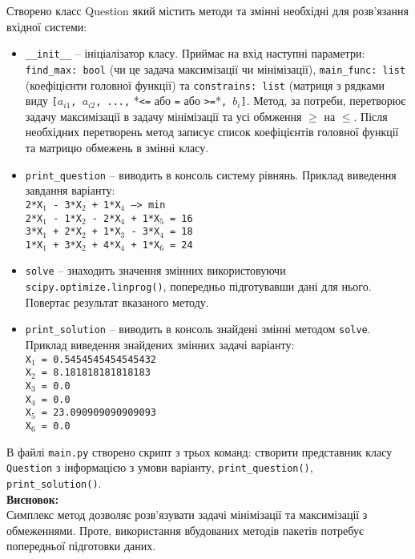 \documentclass{article}
\begin{document}
Створено класс Question який містить методи та змінні необхідні для розв'язання вхідної системи:
\begin{itemize}
	\item\texttt{\_\_init\_\_} -- ініціалізатор класу. Приймає на вхід наступні параметри: \texttt{find\_max: bool} (чи це задача максимізації чи мінімізації),  \texttt{main\_func: list} (коефіцієнти головної функції) та \texttt{constrains: list} (матриця з рядками виду \texttt{[$a_{i1}$, $a_{i2}$, ...,} *\texttt{<=} або \texttt{=} або \texttt{>=}*\texttt{, $b_i$]}. Метод, за потреби, перетворює задачу максимізації в задачу мінімізації та усі обмження $\geq$ на $\leq$. Після необхідних перетворень метод записує список коефіцієнтів головної функції та матрицю обмежень в змінні класу.
	\item\texttt{print\_question} -- виводить в консоль систему рівнянь. Приклад виведення завдання варіанту:\\
	\texttt{2*X$_1$ - 3*X$_2$ + 1*X$_4$ --> min\\
 2*X$_1$ - 1*X$_2$ - 2*X$_4$ + 1*X$_5$ = 16\\
 3*X$_1$ + 2*X$_2$ + 1*X$_3$ - 3*X$_4$ = 18\\
 1*X$_1$ + 3*X$_2$ + 4*X$_4$ + 1*X$_6$ = 24}
 	\item\texttt{solve} -- знаходить значення змінних використовуючи \texttt{scipy.optimize.linprog()}, попередньо підготувавши дані для нього. Повертає результат вказаного методу.
 	\item\texttt{print\_solution} -- виводить в консоль знайдені змінні методом \texttt{solve}. Приклад виведення знайдених змінних задачі варіанту:\\
 	\texttt{X$_1$ = 0.5454545454545432\\
X$_2$ = 8.181818181818183\\
X$_3$ = 0.0\\
X$_4$ = 0.0\\
X$_5$ = 23.090909090909093\\
X$_6$ = 0.0}
\end{itemize}

В файлі \texttt{main.py} створено скрипт з трьох команд: створити представник класу \texttt{Question} з інформацією з умови варіанту, \texttt{print\_question()}, \texttt{print\_solution()}.\\

\textbf{Висновок:}\\

Симплекс метод дозволяє розв'язувати задачі мінімізації та максимізації з обмеженнями. Проте, використання вбудованих методів пакетів потребує попередньої підготовки даних.
\end{document}
